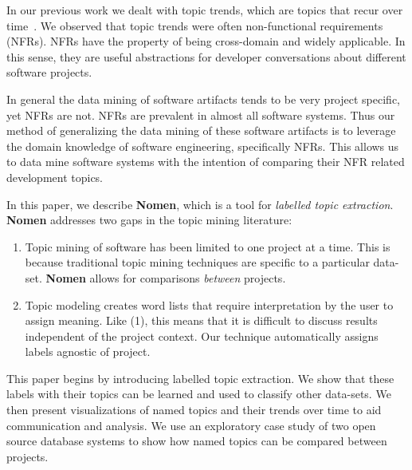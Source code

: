 \documentclass[]{sig-alternate}
\begin{document}
In our previous work we dealt with topic trends, which are topics that recur over time~\cite{Hindle09ICSM}. 
We observed that topic trends were often non-functional requirements (NFRs). 
NFRs have the property of being cross-domain and widely applicable. 
In this sense, they are useful abstractions for developer conversations about different software projects.

In general the data mining of software artifacts tends to be very project specific, yet NFRs are not. 
NFRs are prevalent in almost all software systems.
Thus our method of generalizing the data mining of these software artifacts is to leverage  the domain knowledge of software engineering, specifically NFRs. 
This allows us to data mine software systems with the intention of comparing their NFR related development topics.

In this paper, we describe \textbf{Nomen}, which is a tool for \emph{labelled topic extraction}. \textbf{Nomen} addresses two gaps in the topic mining literature:
\begin{enumerate}
  \item Topic mining of software has been limited to one project at a time. This is because traditional topic mining techniques are specific to a particular data-set. \textbf{Nomen} allows for comparisons \textit{between} projects. 
  \item Topic modeling creates word lists that require interpretation by the user to assign meaning. Like (1), this means
that it is difficult to discuss results independent of the project context. Our technique automatically assigns labels agnostic of project.
\end{enumerate}

This paper begins by introducing labelled topic extraction. We show that these labels with their topics can be learned and used to classify other data-sets. We then present visualizations of named topics and their trends over time to aid communication and analysis. We use an exploratory case study of two open source database systems to show how named topics can be compared between projects.

\end{document}
